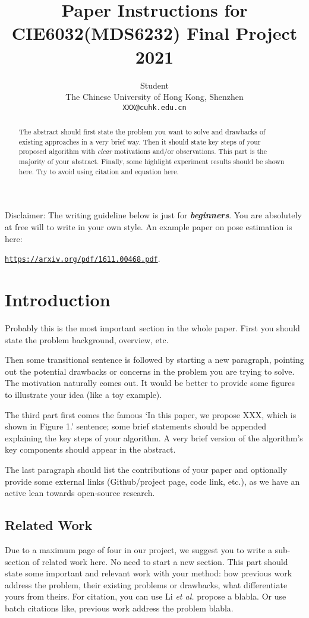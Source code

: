 \documentclass{article}
\title{Paper Instructions for CIE6032(MDS6232) Final Project 2021}
\author{
  Student \\
  The Chinese University of Hong Kong, Shenzhen\\
  \texttt{XXX@cuhk.edu.cn} \\
   \And
}
\begin{document}
\maketitle

\begin{abstract}
  The abstract should first state the problem you want to solve and drawbacks of existing approaches in a very brief way. Then it should state key steps of your proposed algorithm with \textit{clear} motivations and/or observations. This part is the majority of your abstract. Finally, some highlight experiment results should be shown here. Try to avoid using citation and equation here.
\end{abstract}


Disclaimer: The writing guideline below is just for \textbf{\textit{beginners}}. You are absolutely at free will to write in your own style.
%
An example paper on pose estimation is here:

 \href{https://arxiv.org/pdf/1611.00468.pdf}{\texttt{https://arxiv.org/pdf/1611.00468.pdf}}.

\section{Introduction}

Probably this is the most important section in the whole paper. First you should state the problem background, overview, etc.

Then some transitional sentence is followed by starting a new paragraph, pointing out the potential drawbacks or concerns in the problem you are trying to solve. The motivation  naturally comes out. It would be better to provide some figures to illustrate your idea (like a toy example).

The third part first comes the famous `In this paper, we propose XXX, which is shown in Figure 1.' sentence; some brief statements should be appended explaining the key steps of your algorithm. A very brief version of the algorithm's key components should appear in the abstract.

The last paragraph should list the contributions of your paper and optionally provide some external links (Github/project page, code link, etc.), as we have an active lean towards open-source research.

\subsection{Related Work}
Due to a maximum page of four in our project, we suggest you to write a sub-section of related work here. No need to start a new section. This part should state some important and relevant work with your method: how previous work address the problem, their existing problems or drawbacks, what differentiate yours from theirs. For citation, you can use Li \textit{et al.} \cite{MCG} propose a blabla. Or use batch citations like, previous work \cite{bing,scale_aware,Hosang2015Pami} address the problem blabla.
\end{document}
